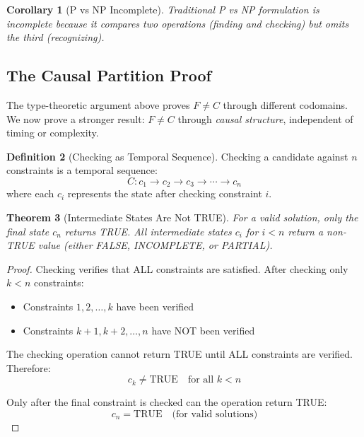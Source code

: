\documentclass[twocolumn,10pt]{article}
\newtheorem{theorem}{Theorem}[section]
\newtheorem{corollary}[theorem]{Corollary}
\theoremstyle{definition}
\newtheorem{definition}[theorem]{Definition}
\theoremstyle{remark}
\begin{document}
\begin{corollary}[P vs NP Incomplete]
\label{cor:pnp_incomplete}
Traditional P vs NP formulation is incomplete because it compares two operations (finding and checking) but omits the third (recognizing).
\end{corollary}

\subsection{The Causal Partition Proof}

The type-theoretic argument above proves $F \neq C$ through different codomains. We now prove a stronger result: $F \neq C$ through \emph{causal structure}, independent of timing or complexity.

\begin{definition}[Checking as Temporal Sequence]
\label{def:checking_sequence}
Checking a candidate against $n$ constraints is a temporal sequence:
\begin{equation}
C: c_1 \to c_2 \to c_3 \to \cdots \to c_n
\end{equation}
where each $c_i$ represents the state after checking constraint $i$.
\end{definition}

\begin{theorem}[Intermediate States Are Not TRUE]
\label{thm:intermediate_states}
For a valid solution, only the final state $c_n$ returns TRUE. All intermediate states $c_i$ for $i < n$ return a non-TRUE value (either FALSE, INCOMPLETE, or PARTIAL).
\end{theorem}

\begin{proof}
Checking verifies that ALL constraints are satisfied. After checking only $k < n$ constraints:
\begin{itemize}
\item Constraints $1, 2, \ldots, k$ have been verified
\item Constraints $k+1, k+2, \ldots, n$ have NOT been verified
\end{itemize}

The checking operation cannot return TRUE until ALL constraints are verified. Therefore:
\begin{equation}
c_k \neq \text{TRUE} \quad \text{for all } k < n
\end{equation}

Only after the final constraint is checked can the operation return TRUE:
\begin{equation}
c_n = \text{TRUE} \quad \text{(for valid solutions)}
\end{equation}
\end{proof}
\end{document}
